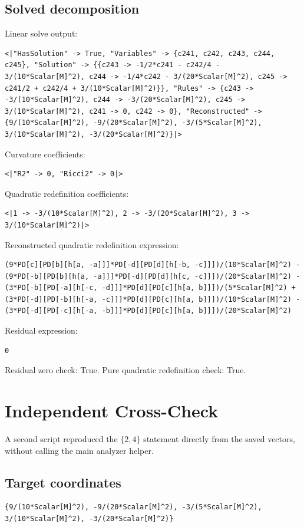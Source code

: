 \documentclass[11pt]{article}
\begin{document}
\subsection{Solved decomposition}
Linear solve output:
\begin{verbatim}
<|"HasSolution" -> True, "Variables" -> {c241, c242, c243, c244, c245}, "Solution" -> {{c243 -> -1/2*c241 - c242/4 - 3/(10*Scalar[M]^2), c244 -> -1/4*c242 - 3/(20*Scalar[M]^2), c245 -> c241/2 + c242/4 + 3/(10*Scalar[M]^2)}}, "Rules" -> {c243 -> -3/(10*Scalar[M]^2), c244 -> -3/(20*Scalar[M]^2), c245 -> 3/(10*Scalar[M]^2), c241 -> 0, c242 -> 0}, "Reconstructed" -> {9/(10*Scalar[M]^2), -9/(20*Scalar[M]^2), -3/(5*Scalar[M]^2), 3/(10*Scalar[M]^2), -3/(20*Scalar[M]^2)}|>
\end{verbatim}
Curvature coefficients:
\begin{verbatim}
<|"R2" -> 0, "Ricci2" -> 0|>
\end{verbatim}
Quadratic redefinition coefficients:
\begin{verbatim}
<|1 -> -3/(10*Scalar[M]^2), 2 -> -3/(20*Scalar[M]^2), 3 -> 3/(10*Scalar[M]^2)|>
\end{verbatim}
Reconstructed quadratic redefinition expression:
\begin{verbatim}
(9*PD[c][PD[b][h[a, -a]]]*PD[-d][PD[d][h[-b, -c]]])/(10*Scalar[M]^2) - (9*PD[-b][PD[b][h[a, -a]]]*PD[-d][PD[d][h[c, -c]]])/(20*Scalar[M]^2) - (3*PD[-b][PD[-a][h[-c, -d]]]*PD[d][PD[c][h[a, b]]])/(5*Scalar[M]^2) + (3*PD[-d][PD[-b][h[-a, -c]]]*PD[d][PD[c][h[a, b]]])/(10*Scalar[M]^2) - (3*PD[-d][PD[-c][h[-a, -b]]]*PD[d][PD[c][h[a, b]]])/(20*Scalar[M]^2)
\end{verbatim}
Residual expression:
\begin{verbatim}
0
\end{verbatim}
Residual zero check: True.
Pure quadratic redefinition check: True.

\section{Independent Cross-Check}
A second script reproduced the $\{2,4\}$ statement directly from the saved vectors, without calling the main analyzer helper.
\subsection{Target coordinates}
\begin{verbatim}
{9/(10*Scalar[M]^2), -9/(20*Scalar[M]^2), -3/(5*Scalar[M]^2), 3/(10*Scalar[M]^2), -3/(20*Scalar[M]^2)}
\end{verbatim}
\end{document}
